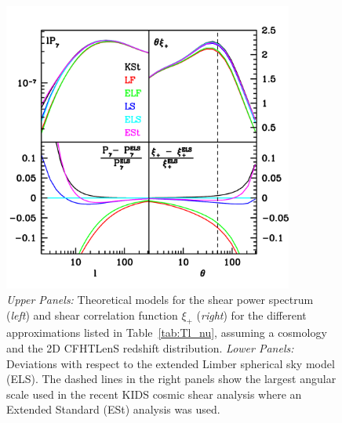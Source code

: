  \begin{figure}
 \begin{center}
 \includegraphics[width=0.85\textwidth]{figures/Cl_xi_comp.pdf}
 \caption{ \label{fig:Cl_xi}\emph{Upper Panels:} Theoretical models for the shear power spectrum (\emph{left}) and shear correlation function $\xi_+$ (\emph{right}) for the different approximations listed in Table~\ref{tab:Tl_nu}, assuming a \citet{planck/cosmo:2015} cosmology and the 2D CFHTLenS redshift distribution. \emph{Lower Panels:} Deviations with respect to the extended Limber spherical sky model (ELS).    The dashed lines in the right panels show the largest angular scale used in the recent KIDS cosmic shear analysis where an Extended Standard (ESt) analysis was used.}
 \end{center}
 \end{figure}
 
